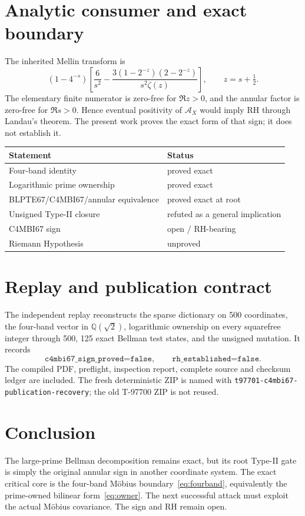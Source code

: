 \documentclass[11pt]{article}
\newcommand{\Acal}{\mathcal A}
\begin{document}
\section{Analytic consumer and exact boundary}
The inherited Mellin transform is
\[
 (1-4^{-s})\left[
 \frac6{s^2}-
 \frac{3(1-2^{-z})(2-2^{-z})}{s^2\zeta(z)}
 \right],\qquad z=s+\tfrac12.
\]
The elementary finite numerator is zero-free for $\Re z>0$, and the annular
factor is zero-free for $\Re s>0$.  Hence eventual positivity of $\Acal_X$
would imply RH through Landau's theorem.  The present work proves the exact
form of that sign; it does not establish it.

\begin{longtable}{p{}p{}}
\toprule
Statement & Status\\
\midrule
Four-band identity & proved exact\\
Logarithmic prime ownership & proved exact\\
BLPTE67/C4MBI67/annular equivalence & proved exact at root\\
Unsigned Type-II closure & refuted as a general implication\\
C4MBI67 sign & open / RH-bearing\\
Riemann Hypothesis & unproved\\
\bottomrule
\end{longtable}

\section{Replay and publication contract}
The independent replay reconstructs the sparse dictionary on 500 coordinates,
the four-band vector in $\mathbb Q(\sqrt2)$, logarithmic ownership on every
squarefree integer through 500, 125 exact Bellman test states, and the unsigned
mutation.  It records
\[
 \texttt{c4mbi67\_sign\_proved=false},\qquad
 \texttt{rh\_established=false}.
\]
The compiled PDF, preflight, inspection report, complete source and checksum
ledger are included.  The fresh deterministic ZIP is named with
\texttt{t97701-c4mbi67-publication-recovery}; the old T-97700 ZIP is not reused.

\section{Conclusion}
The large-prime Bellman decomposition remains exact, but its root Type-II gate
is simply the original annular sign in another coordinate system.  The exact
critical core is the four-band M\"obius boundary~\eqref{eq:fourband}, equivalently
the prime-owned bilinear form~\eqref{eq:owner}.  The next successful attack must
exploit the actual M\"obius covariance.  The sign and RH remain open.
\end{document}
